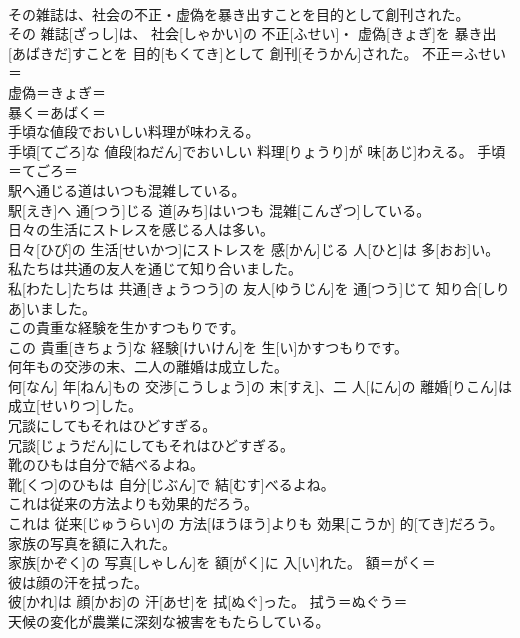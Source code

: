 \documentclass[8pt]{extreport}
\begin{document}
\begin{CJK}{UTF8}{min}
\\	その雑誌は、社会の不正・虚偽を暴き出すことを目的として創刊された。	
\\	その 雑誌[ざっし]は、 社会[しゃかい]の 不正[ふせい]・ 虚偽[きょぎ]を 暴き出[あばきだ]すことを 目的[もくてき]として 創刊[そうかん]された。	不正＝ふせい＝ 
\\	虚偽＝きょぎ＝ 
\\	暴く＝あばく＝ 
\\	手頃な値段でおいしい料理が味わえる。	
\\	手頃[てごろ]な 値段[ねだん]でおいしい 料理[りょうり]が 味[あじ]わえる。	手頃＝てごろ＝ 
\\	駅へ通じる道はいつも混雑している。	
\\	駅[えき]へ 通[つう]じる 道[みち]はいつも 混雑[こんざつ]している。	
\\	日々の生活にストレスを感じる人は多い。	
\\	日々[ひび]の 生活[せいかつ]にストレスを 感[かん]じる 人[ひと]は 多[おお]い。	
\\	私たちは共通の友人を通じて知り合いました。	
\\	私[わたし]たちは 共通[きょうつう]の 友人[ゆうじん]を 通[つう]じて 知り合[しりあ]いました。	
\\	この貴重な経験を生かすつもりです。	
\\	この 貴重[きちょう]な 経験[けいけん]を 生[い]かすつもりです。	
\\	何年もの交渉の末、二人の離婚は成立した。	
\\	何[なん] 年[ねん]もの 交渉[こうしょう]の 末[すえ]、二 人[にん]の 離婚[りこん]は 成立[せいりつ]した。	
\\	冗談にしてもそれはひどすぎる。	
\\	冗談[じょうだん]にしてもそれはひどすぎる。	
\\	靴のひもは自分で結べるよね。	
\\	靴[くつ]のひもは 自分[じぶん]で 結[むす]べるよね。	
\\	これは従来の方法よりも効果的だろう。	
\\	これは 従来[じゅうらい]の 方法[ほうほう]よりも 効果[こうか] 的[てき]だろう。	
\\	家族の写真を額に入れた。	
\\	家族[かぞく]の 写真[しゃしん]を 額[がく]に 入[い]れた。	額＝がく＝ 
\\	彼は顔の汗を拭った。	
\\	彼[かれ]は 顔[かお]の 汗[あせ]を 拭[ぬぐ]った。	拭う＝ぬぐう＝ 
\\	天候の変化が農業に深刻な被害をもたらしている。	

\end{CJK}
\end{document}
